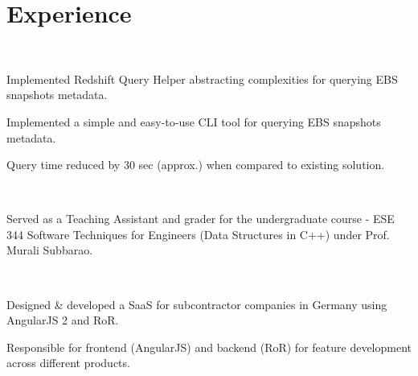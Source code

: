 \documentclass[]{deedy-resume-openfont}
\begin{document}

\section{Experience}
\hfill
{}\\
\begin{tightemize}
\item {} Implemented Redshift Query Helper abstracting complexities for querying EBS snapshots metadata.
\item {} Implemented a simple and easy-to-use CLI tool for querying EBS snapshots metadata.
\item Query time reduced by 30 sec (approx.) when compared to existing solution.
\end{tightemize}

\hfill
{}\\
\begin{tightemize}
\item Served as a Teaching Assistant and grader for the undergraduate course - ESE 344 Software Techniques for Engineers (Data Structures in C++) under Prof. Murali Subbarao.
\end{tightemize}

\hfill
{}\\
\begin{tightemize}
\item {} Designed \& developed a SaaS for subcontractor companies in Germany using AngularJS 2 and RoR.
\item Responsible for frontend (AngularJS) and backend (RoR) for feature development across different products.
\end{tightemize}
\end{document}
